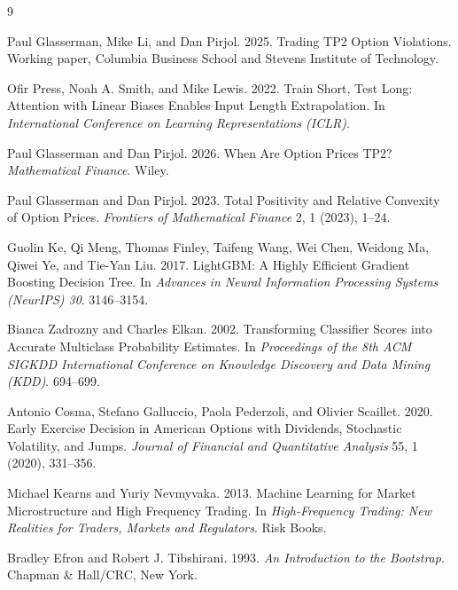 \documentclass[sigconf,review,anonymous]{acmart}
\begin{document}

\begingroup
\small
\setlength{\itemsep}{0pt}
\setlength{\parskip}{0pt}
\begin{thebibliography}{9}

Paul Glasserman, Mike Li, and Dan Pirjol. 2025. Trading TP2 Option Violations. Working paper, Columbia Business School and Stevens Institute of Technology.

Ofir Press, Noah A. Smith, and Mike Lewis. 2022. Train Short, Test Long: Attention with Linear Biases Enables Input Length Extrapolation. In \textit{International Conference on Learning Representations (ICLR)}.

Paul Glasserman and Dan Pirjol. 2026. When Are Option Prices TP2? \textit{Mathematical Finance}. Wiley.

Paul Glasserman and Dan Pirjol. 2023. Total Positivity and Relative Convexity of Option Prices. \textit{Frontiers of Mathematical Finance} 2, 1 (2023), 1--24.

Guolin Ke, Qi Meng, Thomas Finley, Taifeng Wang, Wei Chen, Weidong Ma, Qiwei Ye, and Tie-Yan Liu. 2017. LightGBM: A Highly Efficient Gradient Boosting Decision Tree. In \textit{Advances in Neural Information Processing Systems (NeurIPS) 30}. 3146--3154.

Bianca Zadrozny and Charles Elkan. 2002. Transforming Classifier Scores into Accurate Multiclass Probability Estimates. In \textit{Proceedings of the 8th ACM SIGKDD International Conference on Knowledge Discovery and Data Mining (KDD)}. 694--699.

Antonio Cosma, Stefano Galluccio, Paola Pederzoli, and Olivier Scaillet. 2020. Early Exercise Decision in American Options with Dividends, Stochastic Volatility, and Jumps. \textit{Journal of Financial and Quantitative Analysis} 55, 1 (2020), 331--356.

Michael Kearns and Yuriy Nevmyvaka. 2013. Machine Learning for Market Microstructure and High Frequency Trading. In \textit{High-Frequency Trading: New Realities for Traders, Markets and Regulators}. Risk Books.

Bradley Efron and Robert J. Tibshirani. 1993. \textit{An Introduction to the Bootstrap}. Chapman \& Hall/CRC, New York.

\end{thebibliography}
\endgroup
\end{document}
